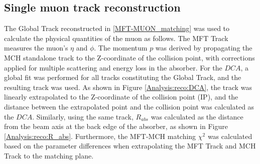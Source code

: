     \subsection{Single muon track reconstruction}
    \label{Single_reco}
        The Global Track reconstructed in \ref{MFT-MUON_matching} was used to calculate the physical quantities of the muon as follows. The MFT Track measures the muon's $\eta$ and $\phi$. The momentum $p$ was derived by propagating the MCH standalone track to the Z-coordinate of the collision point, with corrections applied for multiple scattering and energy loss in the absorber.
        For the $DCA$, a global fit was performed for all tracks constituting the Global Track, and the resulting track was used. 
        As shown in Figure \ref{Analysis:reco:DCA}, the track was linearly extrapolated to the Z-coordinate of the collision point (IP), and the distance between the extrapolated point and the collision point was calculated as the $DCA$. Similarly, using the same track, $R_{abs}$ was calculated as the distance from the beam axis at the back edge of the absorber, as shown in Figure \ref{Analysis:reco:R_abs}.\@
        Furthermore, the MFT-MCH matching $\chi^2$ was calculated based on the parameter differences when extrapolating the MFT Track and MCH Track to the matching plane.
